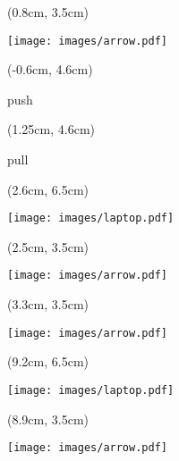 \documentclass[aspectratio=169]{beamer}
\begin{document}
\begin{frame}{}
  \begin{textblock*}{5cm}(0.8cm, 3.5cm)
    \begin{center}
      \texttt{[image: images/arrow.pdf]}
    \end{center}
  \end{textblock*}
  
  \begin{textblock*}{5cm}(-0.6cm, 4.6cm)
    \begin{center}
      {\small push}
    \end{center}
  \end{textblock*}

  \begin{textblock*}{5cm}(1.25cm, 4.6cm)
    \begin{center}
      {\small pull}
    \end{center}
  \end{textblock*}    
  
  \begin{textblock*}{5cm}(2.6cm, 6.5cm)
    \begin{center}
      \texttt{[image: images/laptop.pdf]}
    \end{center}
  \end{textblock*}  

  \begin{textblock*}{5cm}(2.5cm, 3.5cm)
    \begin{center}
      \texttt{[image: images/arrow.pdf]}
    \end{center}
  \end{textblock*}

  \begin{textblock*}{5cm}(3.3cm, 3.5cm)
    \begin{center}
      \texttt{[image: images/arrow.pdf]}
    \end{center}
  \end{textblock*}      

  \begin{textblock*}{5cm}(9.2cm, 6.5cm)
    \begin{center}
      \texttt{[image: images/laptop.pdf]}
    \end{center}
  \end{textblock*}

  \begin{textblock*}{5cm}(8.9cm, 3.5cm)
    \begin{center}
      \texttt{[image: images/arrow.pdf]}
    \end{center}
  \end{textblock*}
  

\end{frame}
\end{document}
